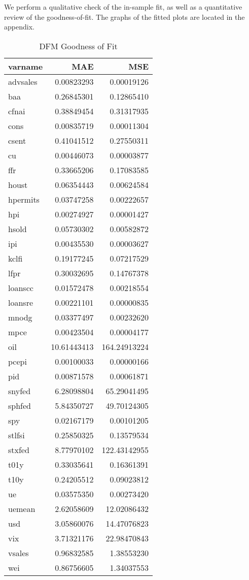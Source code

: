 \documentclass[11pt, letterpaper]{article}\usepackage[]{graphicx}\usepackage[]{color}
\begin{document}
We perform a qualitative check of the in-sample fit, as well as a quantitative review of the goodness-of-fit. The graphs of the fitted plots are located in the appendix.
\begin{table}[H]
\centering
\begingroup\footnotesize
\begin{tabular}{lrr}
  \hline
varname & MAE & MSE \\ 
  \hline
advsales & 0.00823293 & 0.00019126 \\ 
  baa & 0.26845301 & 0.12865410 \\ 
  cfnai & 0.38849454 & 0.31317935 \\ 
  cons & 0.00835719 & 0.00011304 \\ 
  csent & 0.41041512 & 0.27550311 \\ 
  cu & 0.00446073 & 0.00003877 \\ 
  ffr & 0.33665206 & 0.17083585 \\ 
  houst & 0.06354443 & 0.00624584 \\ 
  hpermits & 0.03747258 & 0.00222657 \\ 
  hpi & 0.00274927 & 0.00001427 \\ 
  hsold & 0.05730302 & 0.00582872 \\ 
  ipi & 0.00435530 & 0.00003627 \\ 
  kclfi & 0.19177245 & 0.07217529 \\ 
  lfpr & 0.30032695 & 0.14767378 \\ 
  loanscc & 0.01572478 & 0.00218554 \\ 
  loansre & 0.00221101 & 0.00000835 \\ 
  mnodg & 0.03377497 & 0.00232620 \\ 
  mpce & 0.00423504 & 0.00004177 \\ 
  oil & 10.61443413 & 164.24913224 \\ 
  pcepi & 0.00100033 & 0.00000166 \\ 
  pid & 0.00871578 & 0.00061871 \\ 
  snyfed & 6.28098804 & 65.29041495 \\ 
  sphfed & 5.84350727 & 49.70124305 \\ 
  spy & 0.02167179 & 0.00101205 \\ 
  stlfsi & 0.25850325 & 0.13579534 \\ 
  stxfed & 8.77970102 & 122.43142955 \\ 
  t01y & 0.33035641 & 0.16361391 \\ 
  t10y & 0.24205512 & 0.09023812 \\ 
  ue & 0.03575350 & 0.00273420 \\ 
  uemean & 2.62058609 & 12.02086432 \\ 
  usd & 3.05860076 & 14.47076823 \\ 
  vix & 3.71321176 & 22.98470843 \\ 
  vsales & 0.96832585 & 1.38553230 \\ 
  wei & 0.86756605 & 1.34037553 \\ 
   \hline
\end{tabular}
\endgroup
\caption{DFM Goodness of Fit} 
\end{table}
\end{document}
